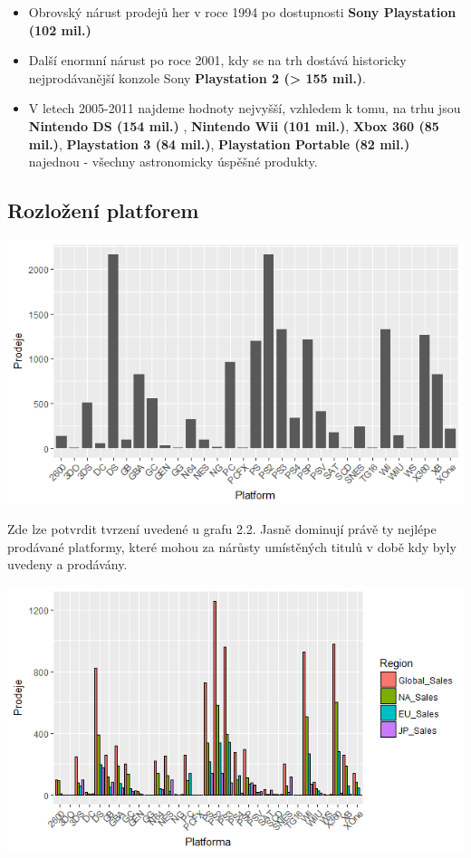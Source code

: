 \documentclass[a4paper,11pt]{article}
\begin{document}
\begin{itemize}
\item Obrovský nárust prodejů her v roce 1994 po dostupnosti \textbf{Sony Playstation (102 mil.)}

\item Další enormní nárust po roce 2001, kdy se na trh dostává historicky nejprodávanější konzole Sony \textbf{Playstation 2 (> 155 mil.)}.

\item V letech 2005-2011 najdeme hodnoty nejvyšší, vzhledem k tomu, na trhu jsou \textbf{Nintendo DS (154 mil.)} , \textbf{Nintendo Wii (101 mil.)}, \textbf{Xbox 360 (85 mil.)}, \textbf{Playstation 3 (84 mil.)}, \textbf{Playstation Portable (82 mil.)}  najednou - všechny astronomicky úspěšné produkty.
\end{itemize}


\newpage

\subsection{Rozložení platforem}

\includegraphics[scale=0.75]{Rplot03}

Zde lze potvrdit tvrzení uvedené u grafu 2.2. Jasně dominují právě ty nejlépe prodávané platformy, které mohou za nárůsty umístěných titulů v době kdy byly uvedeny a prodávány. 



\includegraphics[scale=0.9]{Rplot02}
\end{document}
